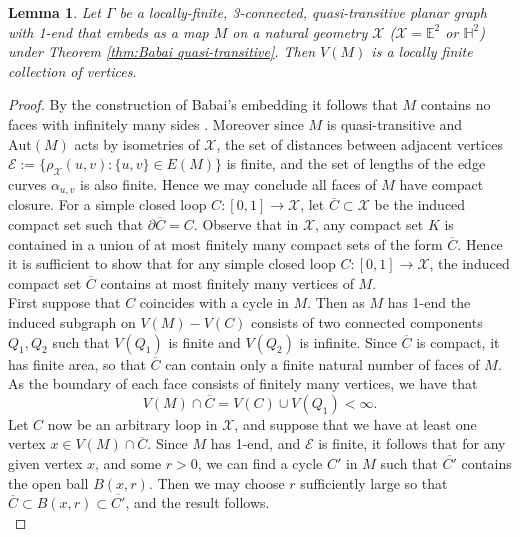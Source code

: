 \documentclass{article}
\numberwithin{equation}{section}
\newcommand{\EE}{\mathbb{E}}
\newcommand{\HH}{\mathbb{H}}
\newtheorem{lemma}{Lemma}[section]
\theoremstyle{definition}
\theoremstyle{remark}
\begin{document}
\begin{lemma}\label{lem:locally finite collection}
    Let $\Gamma$ be a locally-finite, 3-connected, quasi-transitive planar graph with 1-end that embeds as a map $M$ on a natural geometry $\mathcal{X}$ ($\mathcal{X}=\EE^2$ or $\HH^2$) under Theorem \ref{thm:Babai quasi-transitive}. Then $V(M)$ is a locally finite collection of vertices.
\end{lemma}
\begin{proof}
By the construction of Babai's embedding it follows that $M$ contains no faces with infinitely many sides \cite[Lemma 2.2]{Babai97}. Moreover since $M$ is quasi-transitive and $\text{Aut}(M)$ acts by isometries of $\mathcal{X}$, the set of distances between adjacent vertices $\mathcal{E}:=\{\rho_\mathcal{X}(u,v):\{u,v\}\in E(M)\}$ is finite, and the set of lengths of the edge curves $\alpha_{u,v}$ is also finite. Hence we may conclude all faces of $M$ have compact closure. 
 For a simple closed loop $C:[0,1]\rightarrow \mathcal{X}$, let $\overline{C}\subset\mathcal{X}$ be the induced compact set such that $\partial\overline{C}=C$.
Observe that in $\mathcal{X}$, any compact set $K$ is contained in a union of at most finitely many compact sets of the form $\overline{C}$.
Hence it is sufficient to show that for any simple closed loop $C:[0,1]\rightarrow \mathcal{X}$, the induced compact set $\overline{C}$ contains at most finitely many vertices of $M$. \\
First suppose that $C$ coincides with a cycle in $M$. Then as $M$ has 1-end the induced subgraph on $V(M)-V(C)$ consists of two connected components $Q_1,Q_2$ such that $V(Q_1)$ is finite and $V(Q_2)$ is infinite. Since $\overline{C}$ is compact, it has finite area, so that $\overline{C}$ can contain only a finite natural number of faces of $M$. As the boundary of each face consists of finitely many vertices, we have that
$$V(M)\cap\overline{C}=V(C)\cup V(Q_1)<\infty.$$
Let $C$ now be an arbitrary loop in $\mathcal{X}$, and suppose that we have at least one vertex $x\in V(M)\cap \overline{C}$. Since $M$ has 1-end, and $\mathcal{E}$ is finite, it follows that for any given vertex $x$, and some $r>0$, we can find a cycle $C'$ in $M$ such that $\overline{C'}$ contains the open ball $ B(x,r)$. Then we may choose $r$ sufficiently large so that $\overline{C}\subset B(x,r)\subset\overline{C'}$, and the result follows.\\
\end{proof}
\end{document}
